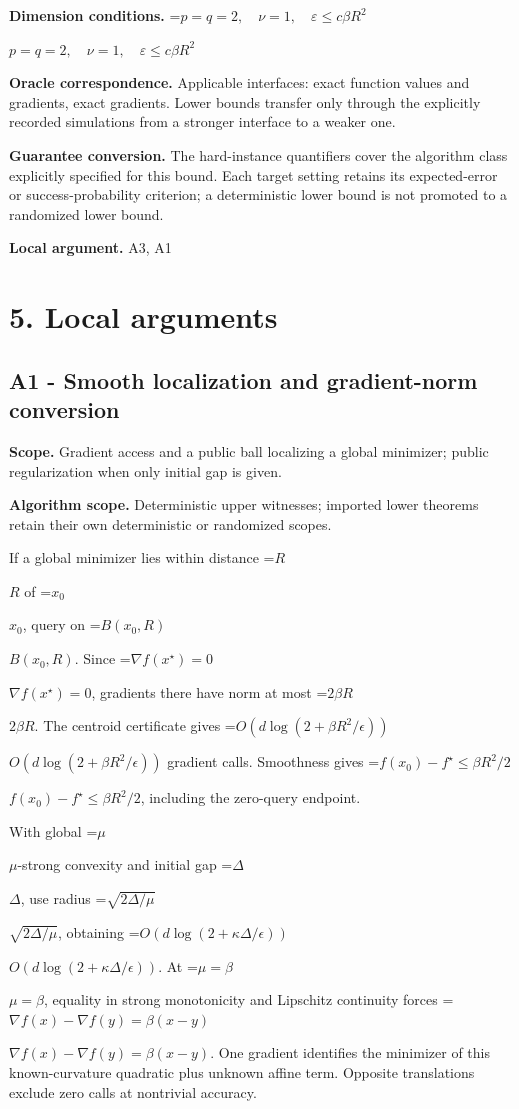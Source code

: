 \documentclass[10pt,a4paper]{article}
\newcommand{\AtlasMath}[1]{\par\begingroup\centering\setbox0=\hbox{$\displaystyle #1$}\ifdim\wd0>1.4\linewidth\typeout{ATLAS WIDE FORMULA: \the\wd0}\fi\ifdim\wd0>\linewidth\resizebox{\linewidth}{!}{\box0}\else\box0\fi\par\endgroup}
\newcommand{\AtlasInlineMath}[1]{\begingroup\setbox0=\hbox{$#1$}\ifdim\wd0>.4\linewidth\endgroup\AtlasMath{#1}\else\endgroup$#1$\fi}
\begin{document}
\textbf{Dimension conditions.} \AtlasInlineMath{p=q=2,\quad\nu=1,\quad\varepsilon\le c\beta R^2}

\textbf{Oracle correspondence.} Applicable interfaces: exact function values and gradients, exact gradients. Lower bounds transfer only through the explicitly recorded simulations from a stronger interface to a weaker one.

\textbf{Guarantee conversion.} The hard-instance quantifiers cover the algorithm class explicitly specified for this bound. Each target setting retains its expected-error or success-probability criterion; a deterministic lower bound is not promoted to a randomized lower bound.

\textbf{Local argument.} A3, A1

\section{5. Local arguments}
\subsection{A1 - Smooth localization and gradient-norm conversion}
\textbf{Scope.} Gradient access and a public ball localizing a global minimizer; public regularization when only initial gap is given.

\textbf{Algorithm scope.} Deterministic upper witnesses; imported lower theorems retain their own deterministic or randomized scopes.

If a global minimizer lies within distance \AtlasInlineMath{R} of \AtlasInlineMath{x_0}, query on \AtlasInlineMath{B(x_0,R)}. Since \AtlasInlineMath{\nabla f(x^\star)=0}, gradients there have norm at most \AtlasInlineMath{2\beta R}. The centroid certificate gives \AtlasInlineMath{O(d\log(2+\beta R^2/\epsilon))} gradient calls. Smoothness gives \AtlasInlineMath{f(x_0)-f^\star\le\beta R^2/2}, including the zero-query endpoint.

With global \AtlasInlineMath{\mu}-strong convexity and initial gap \AtlasInlineMath{\Delta}, use radius \AtlasInlineMath{\sqrt{2\Delta/\mu}}, obtaining \AtlasInlineMath{O(d\log(2+\kappa\Delta/\epsilon))}. At \AtlasInlineMath{\mu=\beta}, equality in strong monotonicity and Lipschitz continuity forces \AtlasInlineMath{\nabla f(x)-\nabla f(y)=\beta(x-y)}. One gradient identifies the minimizer of this known-curvature quadratic plus unknown affine term. Opposite translations exclude zero calls at nontrivial accuracy.
\end{document}
